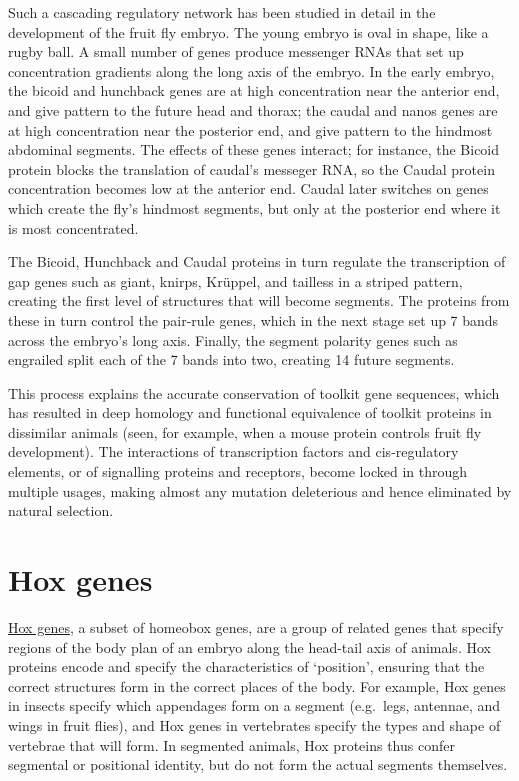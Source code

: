 Such a cascading regulatory network has been studied in detail in the development of the fruit fly embryo. The young embryo is oval in shape, like a rugby ball. A small number of genes produce messenger RNAs that set up concentration gradients along the long axis of the embryo. In the early embryo, the bicoid and hunchback genes are at high concentration near the anterior end, and give pattern to the future head and thorax; the caudal and nanos genes are at high concentration near the posterior end, and give pattern to the hindmost abdominal segments. The effects of these genes interact; for instance, the Bicoid protein blocks the translation of caudal's messeger RNA, so the Caudal protein concentration becomes low at the anterior end. Caudal later switches on genes which create the fly's hindmost segments, but only at the posterior end where it is most concentrated.

The Bicoid, Hunchback and Caudal proteins in turn regulate the transcription of gap genes such as giant, knirps, Krüppel, and tailless in a striped pattern, creating the first level of structures that will become segments. The proteins from these in turn control the pair-rule genes, which in the next stage set up 7 bands across the embryo's long axis. Finally, the segment polarity genes such as engrailed split each of the 7 bands into two, creating 14 future segments.

This process explains the accurate conservation of toolkit gene sequences, which has resulted in deep homology and functional equivalence of toolkit proteins in dissimilar animals (seen, for example, when a mouse protein controls fruit fly development). The interactions of transcription factors and cis-regulatory elements, or of signalling proteins and receptors, become locked in through multiple usages, making almost any mutation deleterious and hence eliminated by natural selection.

\hypertarget{hox-genes}{%
\section{Hox genes}\label{hox-genes}}

\href{https://en.wikipedia.org/wiki/Hox_gene}{Hox genes}, a subset of homeobox genes, are a group of related genes that specify regions of the body plan of an embryo along the head-tail axis of animals. Hox proteins encode and specify the characteristics of `position', ensuring that the correct structures form in the correct places of the body. For example, Hox genes in insects specify which appendages form on a segment (e.g.~legs, antennae, and wings in fruit flies), and Hox genes in vertebrates specify the types and shape of vertebrae that will form. In segmented animals, Hox proteins thus confer segmental or positional identity, but do not form the actual segments themselves.

